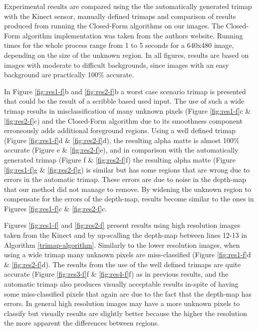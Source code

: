 Experimental results are compared using the the automatically generated trimap with the Kinect sensor, manually defined trimaps and comparison of results produced from running the Closed-Form algorithms on our images. The Closed-Form algorithm implementation was taken from the authors website. Running times for the whole process range from 1 to 5 seconds for a 640x480 image, depending on the size of the unknown region.
In all figures, results are based on images with moderate to difficult backgrounds, since images with an easy background are practically 100\% accurate.
\par
In Figure \ref{fig:res1-f}b and \ref{fig:res2-f}b a worst case scenario trimap is presented that could be the result of a scribble based used input. The use of such a wide trimap results in misclassification of many unknown pixels (Figure \ref{fig:res1-f}c \& \ref{fig:res2-f}c) and the Closed-Form algorithm due to its smoothness component erroneously adds additional foreground regions. Using a well defined trimap (Figure \ref{fig:res1-f}d \& \ref{fig:res2-f}d), the resulting alpha matte is almost 100\% accurate (Figure \label{fig:res1-f}e \& \ref{fig:res2-f}e), and in comparison with the automatically generated trimap (Figure \label{fig:res1-f}f \& \ref{fig:res2-f}f) the resulting alpha matte (Figure \ref{fig:res1-f}g \& \ref{fig:res2-f}g) is similar but has some regions that are wrong due to errors in the automatic trimap. These errors are due to noise in the depth-map that our method did not manage to remove. By widening the unknown region to compensate for the errors of the depth-map, results become similar to the ones in Figures \ref{fig:res1-f}c \& \ref{fig:res2-f}c.
\par
Figures \ref{fig:res1-f} and \ref{fig:res2-f} present results using high resolution images taken from the Kinect and by up-scalling the depth-map between lines 12-13 in Algorithm \ref{trimap-algorithm}. Similarly to the lower resolution images, when using a wide trimap many unknown pixels are miss-classified (Figure \ref{fig:res1-f}d \& \ref{fig:res2-f}d). The results from the use of the well defined trimaps are quite accurate (Figure \ref{fig:res3-f}f \& \ref{fig:res4-f}f) as in previous results, and the automatic trimap also produces visually acceptable results in-spite of having some miss-classified pixels that again are due to the fact that the depth-map has errors. In general high resolution images may have a more unknown pixels to classify but visually results are slightly better because the higher the resolution the more apparent the differences between regions.

